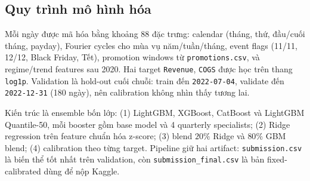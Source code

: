 \documentclass{article}
\begin{document}
\subsection{Quy trình mô hình hóa}
Mỗi ngày được mã hóa bằng khoảng 88 đặc trưng: calendar (tháng, thứ, đầu/cuối tháng, payday), Fourier cycles cho mùa vụ năm/tuần/tháng, event flags (11/11, 12/12, Black Friday, Tết), promotion windows từ \texttt{promotions.csv}, và regime/trend features sau 2020. Hai target \texttt{Revenue}, \texttt{COGS} được học trên thang \texttt{log1p}. Validation là hold-out cuối chuỗi: train đến \texttt{2022-07-04}, validate đến \texttt{2022-12-31} (180 ngày), nên calibration không nhìn thấy tương lai.

Kiến trúc là ensemble bốn lớp: (1) LightGBM, XGBoost, CatBoost và LightGBM Quantile-50, mỗi booster gồm base model và 4 quarterly specialists; (2) Ridge regression trên feature chuẩn hóa z-score; (3) blend $20\%$ Ridge và $80\%$ GBM blend; (4) calibration theo từng target. Pipeline giữ hai artifact: \texttt{submission.csv} là biến thể tốt nhất trên validation, còn \texttt{submission\_final.csv} là bản fixed-calibrated dùng để nộp Kaggle.
\end{document}
